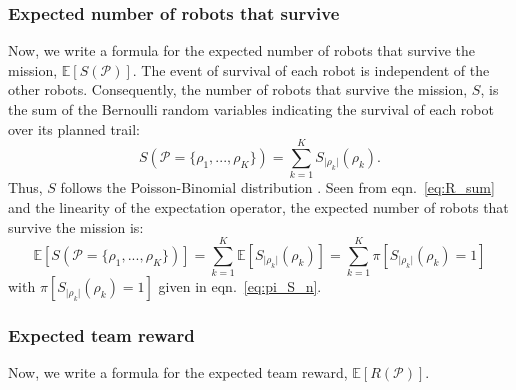 \documentclass[fleqn,10pt,lineno]{wlpeerj}
\begin{document}
\subsubsection{Expected number of robots that survive}
Now, we write a formula for the expected number of robots that survive the mission, $\mathbb{E}[S(\mathcal{P})]$. The event of survival of each robot is independent of the other robots.
Consequently, the number of robots that survive the mission, $S$, is the sum of the Bernoulli random variables indicating the survival of each robot over its planned trail:
\begin{equation}
	S(\mathcal{P}=\{\rho_1, ..., \rho_K\})=\sum_{k=1}^K S_{\lvert \rho_k \rvert}(\rho_k). \label{eq:R_sum}
\end{equation}
Thus, $S$ follows the Poisson-Binomial distribution \cite{tang2023poisson}.
Seen from eqn.~\ref{eq:R_sum} and the linearity of the expectation operator, the expected number of robots that survive the mission is:
\begin{equation}
	\mathbb{E}[S(\mathcal{P}=\{\rho_1, ..., \rho_K\})]=\sum_{k=1}^K \mathbb{E}[S_{\lvert \rho_k \rvert}(\rho_k)] = \sum_{k=1}^K  \pi[S_{\lvert \rho_k \rvert}(\rho_k) = 1] \label{eq:formula_obj2}
\end{equation} with $\pi[S_{\lvert \rho_k \rvert}(\rho_k) = 1]$ given in eqn.~\ref{eq:pi_S_n}.



\subsubsection{Expected team reward}
Now, we write a formula for the expected team reward, $\mathbb{E}[R(\mathcal{P})]$. 
\end{document}
